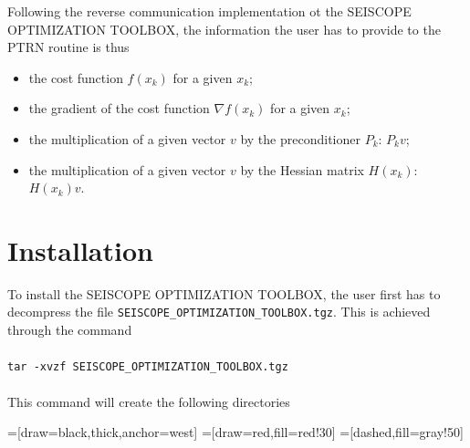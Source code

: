 \documentclass[a4paper,twoside,final,onecolumn,11pt,openright]{article}
\begin{document}
Following the reverse communication implementation ot the SEISCOPE OPTIMIZATION TOOLBOX, the information the user has to provide to the PTRN routine is thus 
\begin{itemize}
 \item the cost function $f(x_k)$ for  a given $x_k$;
 \item the gradient of the cost function $\nabla f(x_k)$ for  a given $x_k$;
 \item the multiplication of a given vector $v$ by the preconditioner $P_k$: $P_kv$;
 \item the multiplication of a given vector $v$ by the Hessian matrix $H(x_k)$: $H(x_k)v$.
\end{itemize}

\newpage
\section{Installation}

To install the SEISCOPE OPTIMIZATION TOOLBOX, the user first has to decompress the file \texttt{SEISCOPE\_OPTIMIZATION\_TOOLBOX.tgz}. This is achieved through the command
\\
\\
\texttt{tar -xvzf SEISCOPE\_OPTIMIZATION\_TOOLBOX.tgz}
\\
\\
This command will create the following directories

\vspace{0.5cm}
=[draw=black,thick,anchor=west]
=[draw=red,fill=red!30]
=[dashed,fill=gray!50]

\vspace{0.5cm}
\end{document}
